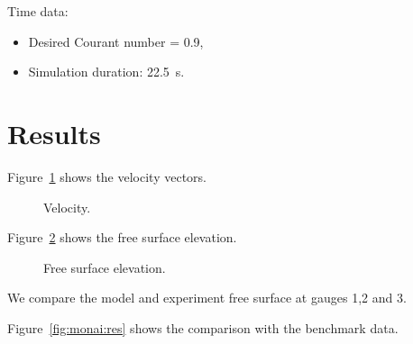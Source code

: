 Time data:
\begin{itemize}
\item Desired Courant number = 0.9,
\item Simulation duration: 22.5~s.
\end{itemize}

\section{Results}

Figure~\ref{fig:monai:vel} shows the velocity vectors.

\begin{figure}[H]
\centering
{}
\caption{Velocity.}
\label{fig:monai:vel}
\end{figure}

Figure~\ref{fig:monai:FreeSurf} shows the free surface elevation.

\begin{figure}[H]
\centering
{}
\caption{Free surface elevation.}
\label{fig:monai:FreeSurf}
\end{figure}

We compare the model and experiment free surface at gauges 1,2 and 3.

Figure~\ref{fig:monai:res} shows the comparison with the benchmark data.

